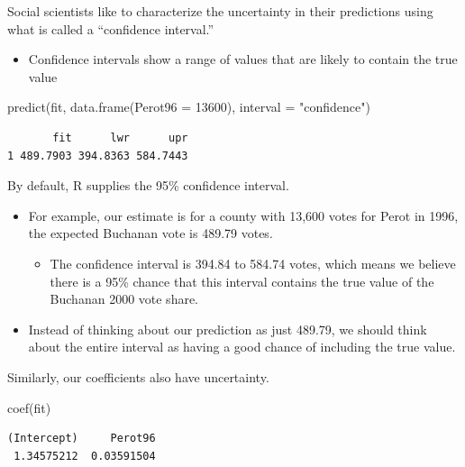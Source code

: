 \documentclass[
  letterpaper,
  DIV=11,
  numbers=noendperiod]{scrreprt}
\newenvironment{Shaded}{\begin{snugshade}}{\end{snugshade}}
\newcommand{\AttributeTok}[1]{\textcolor[rgb]{0.40,0.45,0.13}{#1}}
\newcommand{\DecValTok}[1]{\textcolor[rgb]{0.68,0.00,0.00}{#1}}
\newcommand{\FunctionTok}[1]{\textcolor[rgb]{0.28,0.35,0.67}{#1}}
\newcommand{\NormalTok}[1]{\textcolor[rgb]{0.00,0.23,0.31}{#1}}
\newcommand{\StringTok}[1]{\textcolor[rgb]{0.13,0.47,0.30}{#1}}
\providecommand{\tightlist}{%
  \setlength{\itemsep}{0pt}\setlength{\parskip}{0pt}}\usepackage{longtable,booktabs,array}
\begin{document}
Social scientists like to characterize the uncertainty in their
predictions using what is called a ``confidence interval.''

\begin{itemize}
\tightlist
\item
  Confidence intervals show a range of values that are likely to contain
  the true value
\end{itemize}

\begin{Shaded}
\begin{Highlighting}[]
\FunctionTok{predict}\NormalTok{(fit, }\FunctionTok{data.frame}\NormalTok{(}\AttributeTok{Perot96 =} \DecValTok{13600}\NormalTok{), }\AttributeTok{interval =} \StringTok{"confidence"}\NormalTok{)}
\end{Highlighting}
\end{Shaded}

\begin{verbatim}
       fit      lwr      upr
1 489.7903 394.8363 584.7443
\end{verbatim}

By default, R supplies the 95\% confidence interval.

\begin{itemize}
\tightlist
\item
  For example, our estimate is for a county with 13,600 votes for Perot
  in 1996, the expected Buchanan vote is 489.79 votes.

  \begin{itemize}
  \tightlist
  \item
    The confidence interval is 394.84 to 584.74 votes, which means we
    believe there is a 95\% chance that this interval contains the true
    value of the Buchanan 2000 vote share.
  \end{itemize}
\item
  Instead of thinking about our prediction as just 489.79, we should
  think about the entire interval as having a good chance of including
  the true value.
\end{itemize}

Similarly, our coefficients also have uncertainty.

\begin{Shaded}
\begin{Highlighting}[]
\FunctionTok{coef}\NormalTok{(fit)}
\end{Highlighting}
\end{Shaded}

\begin{verbatim}
(Intercept)     Perot96 
 1.34575212  0.03591504 
\end{verbatim}
\end{document}
